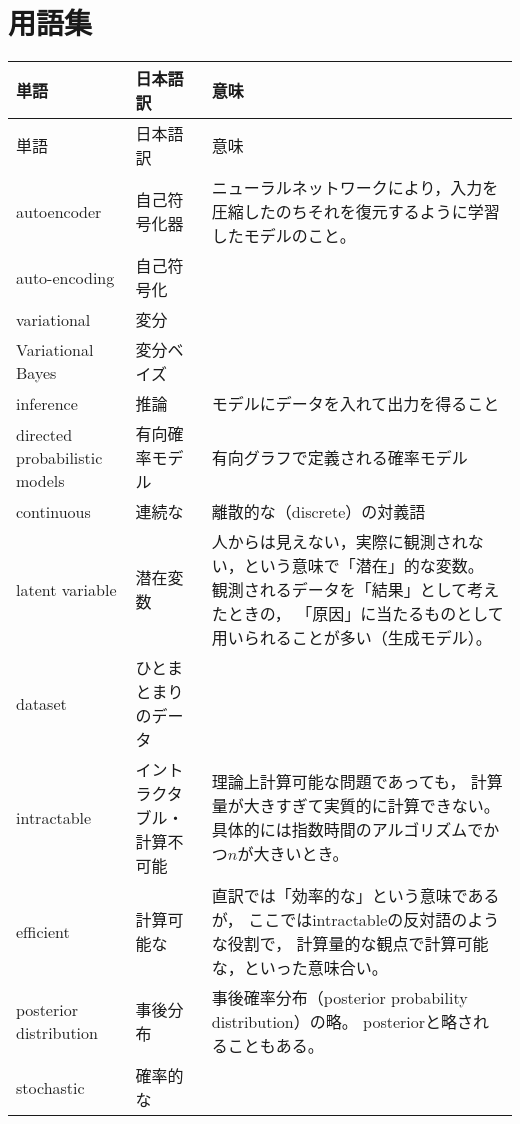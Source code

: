 \documentclass[dvipdfmx, fleqn]{jsarticle}
\begin{document}
\section*{用語集}

\begin{longtable}{p{4cm}p{4cm}p{7cm}}
    \label{tab:terms}
    \\ \hline
    単語 & 日本語訳 & 意味 \tabularnewline \hline \hline
    \endfirsthead
    単語 & 日本語訳 & 意味 \tabularnewline \hline \hline
    \endhead
        autoencoder
            & 自己符号化器
            & ニューラルネットワークにより，入力を圧縮したのちそれを復元するように学習したモデルのこと。
            \tabularnewline \hline
        auto-encoding
            & 自己符号化
            & 
            \tabularnewline \hline
        variational
            & 変分
            & 
            \tabularnewline \hline
        Variational Bayes
            & 変分ベイズ
            & 
            \tabularnewline \hline
        inference
            & 推論
            & モデルにデータを入れて出力を得ること
            \tabularnewline \hline
        directed probabilistic models
            & 有向確率モデル
            & 有向グラフで定義される確率モデル
            \tabularnewline \hline
        continuous
            & 連続な
            & 離散的な（discrete）の対義語
            \tabularnewline \hline
        latent variable
            & 潜在変数
            & 人からは見えない，実際に観測されない，という意味で「潜在」的な変数。
            観測されるデータを「結果」として考えたときの，
            「原因」に当たるものとして用いられることが多い（生成モデル）。
            \tabularnewline \hline
        dataset
            & ひとまとまりのデータ
            & 
            \tabularnewline \hline
        intractable
            & イントラクタブル・計算不可能
            & 理論上計算可能な問題であっても，
            計算量が大きすぎて実質的に計算できない。
            具体的には指数時間のアルゴリズムでかつ\(n\)が大きいとき。
            \tabularnewline \hline
        efficient
            & 計算可能な
            & 直訳では「効率的な」という意味であるが，
            ここではintractableの反対語のような役割で，
            計算量的な観点で計算可能な，といった意味合い。
            \tabularnewline \hline
        posterior distribution
            & 事後分布
            & 事後確率分布（posterior probability distribution）の略。
            posteriorと略されることもある。
            \tabularnewline \hline
        stochastic
            & 確率的な
            & 
            \tabularnewline \hline

\end{longtable}
\end{document}
